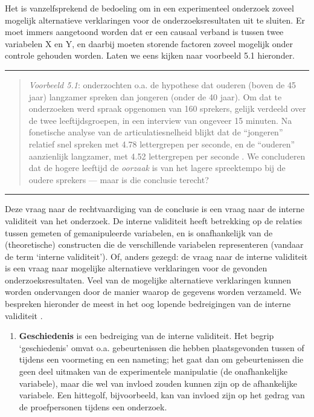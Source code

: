 \documentclass[
]{book}
\providecommand{\tightlist}{%
  \setlength{\itemsep}{0pt}\setlength{\parskip}{0pt}}
\begin{document}
Het is vanzelfsprekend de bedoeling om in een experimenteel onderzoek
zoveel mogelijk alternatieve verklaringen voor de onderzoeksresultaten
uit te sluiten. Er moet immers aangetoond worden dat er een causaal
verband is tussen twee variabelen X en Y, en daarbij moeten storende
factoren zoveel mogelijk onder controle gehouden worden. Laten we eens
kijken naar voorbeeld 5.1 hieronder.

\begin{center}\rule{0.5\linewidth}{0.5pt}\end{center}

\begin{quote}
\emph{Voorbeeld 5.1}: \citep{Verh04} onderzochten o.a. de hypothese dat
ouderen (boven de 45 jaar) langzamer spreken dan jongeren (onder de 40
jaar). Om dat te onderzoeken werd spraak opgenomen van 160 sprekers,
gelijk verdeeld over de twee leeftijdsgroepen, in een interview van
ongeveer 15 minuten. Na fonetische analyse van de articulatiesnelheid
blijkt dat de ``jongeren'' relatief snel spreken met 4.78 lettergrepen per
seconde, en de ``ouderen'' aanzienlijk langzamer, met 4.52 lettergrepen
per seconde \citep[p.302]{Verh04}. We concluderen dat de hogere leeftijd de
\emph{oorzaak} is van het lagere spreektempo bij de oudere sprekers --- maar
is die conclusie terecht?
\end{quote}

\begin{center}\rule{0.5\linewidth}{0.5pt}\end{center}

Deze vraag naar de rechtvaardiging van de conclusie is een vraag naar de
interne validiteit van het onderzoek. De interne validiteit heeft
betrekking op de relaties tussen gemeten of gemanipuleerde variabelen,
en is onafhankelijk van de (theoretische) constructen die de
verschillende variabelen representeren (vandaar de term `interne
validiteit'). Of, anders gezegd: de vraag naar de interne validiteit is
een vraag naar mogelijke alternatieve verklaringen voor de gevonden
onderzoeksresultaten. Veel van de mogelijke alternatieve verklaringen
kunnen worden ondervangen door de manier waarop de gegevens worden
verzameld. We bespreken hieronder de meest in het oog lopende
bedreigingen van de interne validiteit \citep{SCC02}.

\begin{enumerate}
\def\labelenumi{\arabic{enumi}.}
\tightlist
\item
  \textbf{Geschiedenis}
  is een bedreiging van de
  interne validiteit. Het begrip `geschiedenis' omvat o.a. gebeurtenissen
  die hebben plaatsgevonden tussen of tijdens een voormeting en een
  nameting; het gaat dan om gebeurtenissen die geen deel uitmaken van de
  experimentele manipulatie (de onafhankelijke variabele), maar die wel
  van invloed zouden kunnen zijn op de afhankelijke variabele. Een
  hittegolf, bijvoorbeeld, kan van invloed zijn op het gedrag van de
  proefpersonen tijdens een onderzoek.
\end{enumerate}
\end{document}
